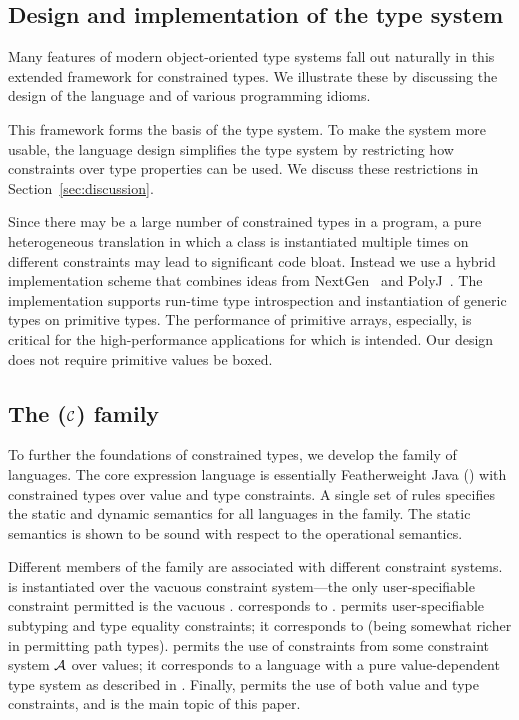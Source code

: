 \subsection{Design and implementation of the \Xten{} type system}

Many features of modern object-oriented type systems fall out
naturally in this extended framework for constrained types.
%
We illustrate these by discussing the design of
the \Xten{} language and of various
programming idioms.

This framework forms the basis of the \Xten type system.
To make the system more usable,
the \Xten language design simplifies the type system by
restricting how constraints over type properties can be used.
We discuss these restrictions in Section~\ref{sec:discussion}.

Since there may be a large number of constrained types
in a program, a pure heterogeneous translation
in which a class is instantiated multiple times on different
constraints
may lead to significant
code bloat. Instead we use a hybrid implementation scheme that
combines ideas from NextGen~\cite{nextgen,allen03} and
PolyJ~\cite{java-popl97}. The implementation supports run-time type
introspection and instantiation of generic types on primitive types.
The performance of primitive arrays, especially, is critical for the
high-performance applications for which \Xten{} is intended.  Our
design does not require primitive values be boxed.

\subsection{The \FX($\cal C$) family}
To further the foundations of constrained types, we develop the \FX{}
family of languages. The core expression language is essentially
Featherweight Java (\FJ \cite{FJ}) with constrained types over
value and type constraints.
A single set of rules specifies the static and dynamic
semantics for all languages in the family.  The static semantics is
shown to be sound with respect to the operational semantics.

Different members of the family are associated with different
constraint systems. \FXZ{} is
\FX{} instantiated over the vacuous constraint system---the only
user-specifiable constraint permitted is the vacuous . \FXZ{}
corresponds to \FJ. \FXG{} permits user-specifiable subtyping
and type equality constraints; it corresponds to
\FGJ{} (being somewhat richer in permitting path types). \FXD{} permits
the use of constraints from some constraint system $\cal A$ over
values; it
corresponds to a language with a pure value-dependent type system as
described in \cite{constrained-types}. Finally, \FXGD{} permits the
use of both value and type constraints,
and is the main topic of this paper.


